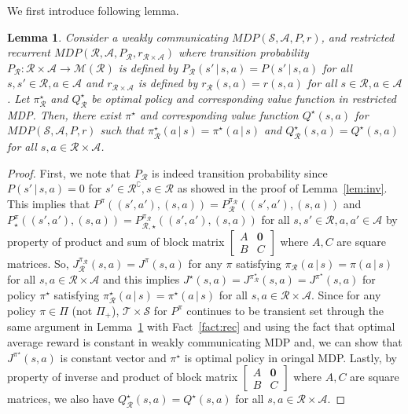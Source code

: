 \documentclass{article}
\newtheorem{lemma}[theorem]{Lemma}
\theoremstyle{definition}
\theoremstyle{remark}
\newcommand{\cA}{\mathcal{A}}
\newcommand{\cS}{\mathcal{S}}
\newcommand{\cM}{\mathcal{M}}
\newcommand{\cR}{\mathcal{R}}
\newcommand{\cT}{\mathcal{T}}
\begin{document}
We first introduce following lemma. 
\begin{lemma}\label{lem:rec}
    Consider a weakly communicating $MDP(\cS,\cA, P, r)$, and restricted recurrent $MDP(\cR,\cA, P_\cR, r_{\cR \times \cA})$ where transition probability $P_\cR: \cR\times \cA \rightarrow \cM(\cR)$ is defined by $P_\cR(s' \,|\, s,a) = P(s' \,|\, s,a)$ for all $s,s' \in \cR, a \in \cA$ and $ r_{\cR \times \cA}$ is defined by $r_\cR(s,a) = r(s,a)$ for all $s \in \cR, a \in \cA$. Let $\pi^\star_\cR$ and $Q_{\cR}^\star$ be optimal policy and corresponding value function in restricted MDP. Then, there exist $\pi^\star$ and corresponding value function $Q^\star(s,a)$ for $MDP(\cS,\cA, P, r)$ such that $\pi^\star_\cR(a \,|\,s)=\pi^\star(a \,|\,s)$ and $Q^\star_{\cR}(s,a)=Q^\star(s,a)$ for all $s, a \in\cR \times \cA$.
\end{lemma}
\begin{proof}
    First, we note that $P_\cR$ is indeed transition probability since  $P(s' \,|\, s,a) =0$ for $s' \in \cR^\complement, s\in \cR $ as showed in the proof of Lemma~\ref{lem:inv}. This implies that $P^\pi((s',a'),(s,a))=P_{\cR}^{\pi_\cR}((s',a'),(s,a))$ and  $P^\pi_\star((s',a'),(s,a))=P_{\cR,\star}^{\pi_\cR}((s',a'),(s,a))$ for all $s,s'\in \cR, a,a'\in \cA$  by property of product and sum of block matrix $\begin{bmatrix}
       A & \mathbf{0}
        \\B& C
    \end{bmatrix}$ where $A,C$ are square matrices. So, $J_\cR^{\pi_\cR}(s,a)=J^{\pi}(s,a)$ for any $\pi$ satisfying  $\pi_\cR(a \,|\,s)=\pi(a \,|\,s)$  for all $s, a \in\cR \times \cA$ and this implies $J^\star(s,a)=J^{\pi^\star_\cR}(s,a)=J^{\pi^\star}(s,a)$ for policy $\pi^\star$ satisfying $\pi^\star_\cR(a \,|\,s)=\pi^\star(a \,|\,s)$  for all $s, a \in\cR \times \cA$. Since  for any policy $\pi\in \Pi$ (not $\Pi_+$), $\cT\times \cS$ for $P^\pi$ continues to be transient set through the same argument in Lemma~\ref{lem:rec} with Fact~\ref{fact:rec} and  using the fact that optimal average reward is constant in weakly communicating MDP and, we can show that $J^{\pi^\star}(s,a)$ is constant vector and $\pi^\star$ is optimal policy in oringal MDP. Lastly, by property of inverse and product of block matrix $\begin{bmatrix}
       A & \mathbf{0}
        \\B& C
    \end{bmatrix}$ where $A,C$ are square matrices, we also have $Q^\star_{\cR}(s,a)=Q^\star(s,a)$ for all $s, a \in\cR \times \cA$.  
\end{proof}
\end{document}
